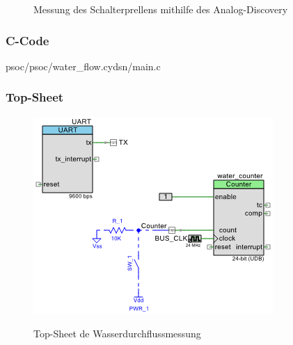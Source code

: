 \documentclass[12pt,a4paper,german]{article}
\begin{document}
\begin{figure}[H]
	
	\centering
	\label{fig:prellen}

	\caption{Messung des Schalterprellens mithilfe des Analog-Discovery}
\end{figure}


\subsubsection{C-Code}


	{psoc/psoc/water_flow.cydsn/main.c}

\subsubsection{Top-Sheet}
	 
	\begin{figure}[H]
		\centering
		\includegraphics[width=\textwidth]{pictures/topsch_watercount.png}
		\label{fig:topsch_watercount}
		\caption{Top-Sheet de Wasserdurchflussmessung}
	\end{figure}
\end{document}
